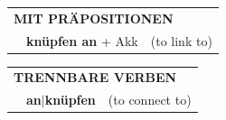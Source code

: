 \documentclass[10pt,a4paper]{revtex4-2}
\begin{document}
\begin{verbbox}
\vspace{10pt}

\begin{tabular}{lll}
\multicolumn{3}{l}{\textbf{MIT PRÄPOSITIONEN}}\\
& \textbf{knüpfen an} + Akk & (to link to)\\
\end{tabular}
\hfill
\begin{tabular}{lll}
\multicolumn{3}{l}{\textbf{TRENNBARE VERBEN}}\\
& \textbf{an$|$knüpfen} & (to connect to)\\
\end{tabular}

\vspace{-5pt}
\end{verbbox}
\end{document}
